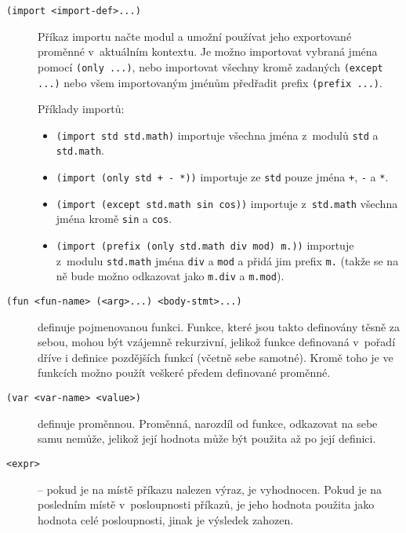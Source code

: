 \begin{description}

\item[\texttt{(import <import-def>...)}] Příkaz importu načte modul a umožní
  používat jeho exportované proměnné v~aktuálním kontextu. Je možno importovat
  vybraná jména pomocí \texttt{(only ...)}, nebo importovat všechny kromě zadaných
  \texttt{(except ...)} nebo všem importovaným jménům předřadit prefix
  \texttt{(prefix ...)}.

  Příklady importů:

  \begin{itemize}
    \item \texttt{(import std std.math)} importuje všechna jména z~modulů
      \texttt{std} a \texttt{std.math}.
    \item \texttt{(import (only std + - *))} importuje ze \texttt{std} pouze jména
      \texttt{+}, \texttt{-} a \texttt{*}.
    \item \texttt{(import (except std.math sin cos))} importuje
      z~\texttt{std.math} všechna jména kromě \texttt{sin} a \texttt{cos}.
    \item \texttt{(import (prefix (only std.math div mod) m.))} importuje z~modulu
      \texttt{std.math} jména \texttt{div} a \texttt{mod} a přidá jim prefix
      \texttt{m.} (takže se na ně bude možno odkazovat jako \texttt{m.div} a
      \texttt{m.mod}).
  \end{itemize}

\item[\texttt{(fun <fun-name> (<arg>...) <body-stmt>...)}] definuje pojmenovanou
  funkci. Funkce, které jsou takto definovány těsně za sebou, mohou být vzájemně
  rekurzivní, jelikož funkce definovaná v~pořadí dříve  i definice
  pozdějších funkcí (včetně sebe samotné). Kromě toho je ve funkcích možno použít
  veškeré předem definované proměnné.

\item[\texttt{(var <var-name> <value>)}] definuje proměnnou. Proměnná, narozdíl
  od funkce, odkazovat na sebe samu nemůže, jelikož její hodnota může být použita
  až po její definici.

\item[\texttt{<expr>}] -- pokud je na místě příkazu nalezen výraz, je vyhodnocen.
  Pokud je na posledním místě v~posloupnosti příkazů, je jeho hodnota použita jako
  hodnota celé posloupnosti, jinak je výsledek zahozen.

\end{description}

